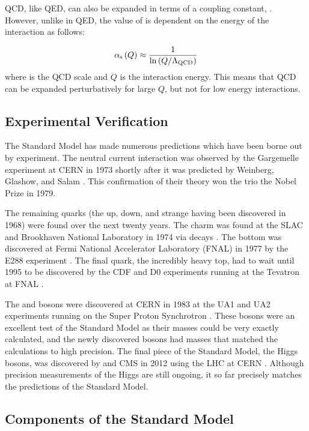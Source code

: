 QCD, like QED, can also be expanded in terms of a coupling constant,
\alphastrong. However, unlike \fsc in QED, the value of \alphastrong is
dependent on the energy of the interaction as follows:

\begin{equation}\label{eq:alpha_strong}
    \alpha_{\text{s}} \left( Q \right)
    \approx
    \frac{1}{
        \operatorname{ln} \left( Q / \Lambda_{\text{QCD}} \right)
    }
\end{equation}
%
where \LambdaQCD is the QCD scale and $Q$ is the interaction energy. This means
that QCD can be expanded perturbatively for large $Q$, but not for low energy
interactions.

\subsection{Experimental Verification}

The Standard Model has made numerous predictions which have been borne out by
experiment. The neutral current interaction was observed by the Gargemelle
experiment at CERN in 1973 shortly after it was predicted by Weinberg, Glashow,
and Salam \cite{hasert1973}. This confirmation of their theory won the trio the
Nobel Prize in 1979.

The remaining quarks (the up, down, and strange having been discovered in 1968)
were found over the next twenty years. The charm was found at the SLAC and
Brookhaven National Laboratory in 1974 via \jpsi decays
\cite{aubert1974,augustin1974}. The bottom was discovered at Fermi National
Accelerator Laboratory (FNAL) in 1977 by the E288 experiment \cite{herb1977}.
The final quark, the incredibly heavy top, had to wait until 1995 to be
discovered by the CDF and D0 experiments running at the Tevatron at FNAL
\cite{cdf1995,d01995}.

The \W and \Z bosons were discovered at CERN in 1983 at the UA1 and UA2
experiments running on the Super Proton Synchrotron
\cite{ua1_w,ua2_w,ua1_z,ua2_z}. These bosons were an excellent test of the
Standard Model as their masses could be very exactly calculated, and the newly
discovered bosons had masses that matched the calculations to high precision.
The final piece of the Standard Model, the Higgs bosons, was discovered by
\ATLAS and CMS in 2012 using the LHC at CERN \cite{atlas_higgs,cms_higgs}.
Although precision measurements of the Higgs are still ongoing, it so far
precisely matches the predictions of the Standard Model.

\subsection{Components of the Standard Model}

